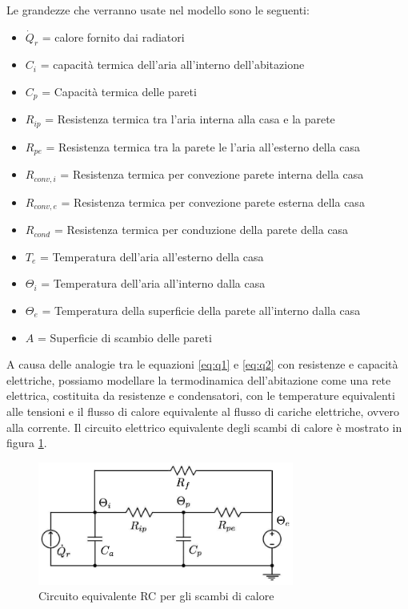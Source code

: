 \documentclass[laurea,oneside,11pt]{USiena_tesiLM}
\begin{document}
Le grandezze che verranno usate nel modello sono le seguenti:
\begin{itemize}
\item[] $\dot{Q}_r$ = calore fornito dai radiatori
\item[]$C_i$ = capacità termica dell'aria all'interno dell'abitazione
\item[]$C_p$ = Capacità termica delle pareti
\item[]$R_{ip}$ = Resistenza termica tra l'aria interna alla casa e la parete
\item[]$R_{pe}$ = Resistenza termica tra la parete le l'aria all'esterno della casa
\item[]$R_{conv,i}$ = Resistenza termica per convezione   parete interna della casa
\item[]$R_{conv,e}$ = Resistenza termica per convezione  parete esterna della casa
\item[]$R_{cond}$ = Resistenza termica per conduzione della parete della casa
\item[]$T_{e}$ = Temperatura dell'aria all'esterno della casa
\item[]$\Theta_i$ = Temperatura dell'aria all'interno dalla casa
\item[]$\Theta_e$ = Temperatura della superficie della parete all'interno dalla casa 
\item[]$A$ = Superficie di scambio delle pareti
\end{itemize}


A causa delle analogie tra le equazioni \ref{eq:q1} e \ref{eq:q2} con resistenze e capacità elettriche, possiamo modellare la termodinamica dell'abitazione come una rete elettrica, costituita da resistenze e condensatori, con le temperature equivalenti alle tensioni e il flusso di calore equivalente al flusso di cariche elettriche, ovvero alla corrente. Il circuito elettrico equivalente degli scambi di calore è mostrato in figura \ref{fig:RC}.

\begin{figure}[h]
\begin{center}
\includegraphics[width=0.75\textwidth]{figure/schema_trasf_calore}
\caption{Circuito equivalente RC per gli scambi di calore}
\label{fig:RC}
\end{center}
\end{figure}
 
\end{document}
